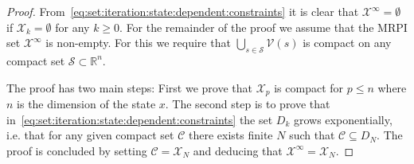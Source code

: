 \documentclass[letterpaper, 10pt, conference]{ieeeconf} %
\begin{document}
\begin{proof}
From~\eqref{eq:set:iteration:state:dependent:constraints} it is clear that $\mathcal X^\infty = \emptyset$ if $\mathcal X_k =\emptyset$ for any $k\geq 0$.
For the remainder of the proof we assume
that the MRPI set $\mathcal X^\infty$ is non-empty. For this we require that $\bigcup_{s\in\mathcal S}\mathcal V(s)$ is compact on any compact set $\mathcal S\subset\mathbb R^n$.

The proof has two main steps: First we prove that $\mathcal X_p$ is compact for $p\leq n$
where $n$ is the dimension of the state $x$. The second step is to prove that in~\eqref{eq:set:iteration:state:dependent:constraints}
the set $D_k$ grows exponentially, i.e. that for any given compact set $\mathcal C$ there exists
finite $N$ such that $\mathcal C\subseteq D_{N}$. The proof is concluded by setting 
$\mathcal C = \mathcal X_{N}$ and deducing that $\mathcal X^\infty = \mathcal X_N$. 


\end{proof}
\end{document}
